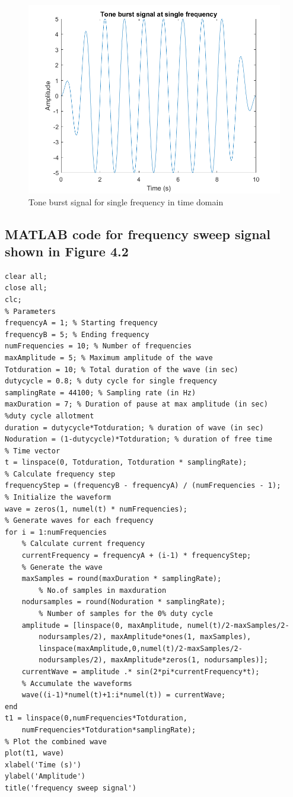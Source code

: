 \begin{figure}[H]\label{fig4.1}
\centering \includegraphics[scale=0.4]{Images/freqsweep1.png}
\caption{Tone burst signal for single frequency in time domain}
\end{figure}

\subsection*{MATLAB code for frequency sweep signal shown in Figure 4.2}
\begin{verbatim}
clear all;
close all;
clc;
% Parameters
frequencyA = 1; % Starting frequency
frequencyB = 5; % Ending frequency
numFrequencies = 10; % Number of frequencies
maxAmplitude = 5; % Maximum amplitude of the wave
Totduration = 10; % Total duration of the wave (in sec)
dutycycle = 0.8; % duty cycle for single frequency
samplingRate = 44100; % Sampling rate (in Hz)
maxDuration = 7; % Duration of pause at max amplitude (in sec)
%duty cycle allotment
duration = dutycycle*Totduration; % duration of wave (in sec)
Noduration = (1-dutycycle)*Totduration; % duration of free time
% Time vector
t = linspace(0, Totduration, Totduration * samplingRate);
% Calculate frequency step
frequencyStep = (frequencyB - frequencyA) / (numFrequencies - 1);
% Initialize the waveform
wave = zeros(1, numel(t) * numFrequencies);
% Generate waves for each frequency
for i = 1:numFrequencies
    % Calculate current frequency
    currentFrequency = frequencyA + (i-1) * frequencyStep;
    % Generate the wave
    maxSamples = round(maxDuration * samplingRate); 
        % No.of samples in maxduration
    nodursamples = round(Noduration * samplingRate); 
        % Number of samples for the 0% duty cycle
    amplitude = [linspace(0, maxAmplitude, numel(t)/2-maxSamples/2-
        nodursamples/2), maxAmplitude*ones(1, maxSamples), 
        linspace(maxAmplitude,0,numel(t)/2-maxSamples/2-
        nodursamples/2), maxAmplitude*zeros(1, nodursamples)];
    currentWave = amplitude .* sin(2*pi*currentFrequency*t);
    % Accumulate the waveforms
    wave((i-1)*numel(t)+1:i*numel(t)) = currentWave;
end
t1 = linspace(0,numFrequencies*Totduration,
    numFrequencies*Totduration*samplingRate);
% Plot the combined wave
plot(t1, wave)
xlabel('Time (s)')
ylabel('Amplitude')
title('frequency sweep signal')
\end{verbatim}

